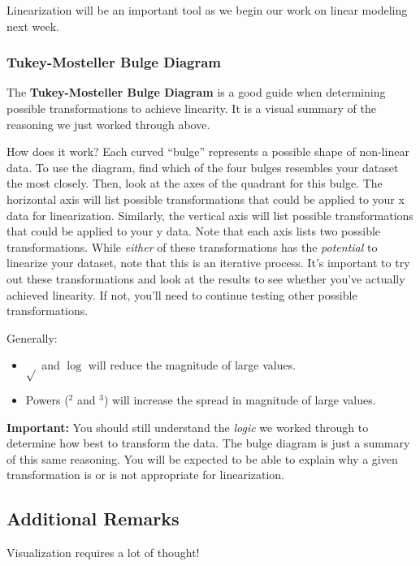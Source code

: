 \documentclass[
  letterpaper,
  DIV=11,
  numbers=noendperiod]{scrreprt}
\providecommand{\tightlist}{%
  \setlength{\itemsep}{0pt}\setlength{\parskip}{0pt}}\usepackage{longtable,booktabs,array}
\begin{document}
Linearization will be an important tool as we begin our work on linear
modeling next week.

\subsubsection{Tukey-Mosteller Bulge
Diagram}\label{tukey-mosteller-bulge-diagram}

The \textbf{Tukey-Mosteller Bulge Diagram} is a good guide when
determining possible transformations to achieve linearity. It is a
visual summary of the reasoning we just worked through above.

How does it work? Each curved ``bulge'' represents a possible shape of
non-linear data. To use the diagram, find which of the four bulges
resembles your dataset the most closely. Then, look at the axes of the
quadrant for this bulge. The horizontal axis will list possible
transformations that could be applied to your x data for linearization.
Similarly, the vertical axis will list possible transformations that
could be applied to your y data. Note that each axis lists two possible
transformations. While \emph{either} of these transformations has the
\emph{potential} to linearize your dataset, note that this is an
iterative process. It's important to try out these transformations and
look at the results to see whether you've actually achieved linearity.
If not, you'll need to continue testing other possible transformations.

Generally:

\begin{itemize}
\tightlist
\item
  \(\sqrt{}\) and \(\log{}\) will reduce the magnitude of large values.
\item
  Powers (\(^2\) and \(^3\)) will increase the spread in magnitude of
  large values.
\end{itemize}

\textbf{Important:} You should still understand the \emph{logic} we
worked through to determine how best to transform the data. The bulge
diagram is just a summary of this same reasoning. You will be expected
to be able to explain why a given transformation is or is not
appropriate for linearization.

\subsection{Additional Remarks}\label{additional-remarks}

Visualization requires a lot of thought!
\end{document}

